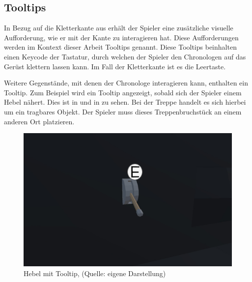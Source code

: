 \subsection{Tooltips}\label{sec:tooltip}

In Bezug auf die Kletterkante aus  erhält der Spieler eine zusätzliche visuelle Aufforderung, wie er mit der Kante zu interagieren hat. Diese Aufforderungen werden im Kontext dieser Arbeit Tooltips genannt. Diese Tooltips beinhalten einen Keycode der Tastatur, durch welchen der Spieler den Chronologen auf das Gerüst klettern lassen kann. Im Fall der Kletterkante ist es die Leertaste.

\newpage

Weitere Gegenstände, mit denen der Chronologe interagieren kann, enthalten ein Tooltip. Zum Beispiel wird ein Tooltip angezeigt, sobald sich der Spieler einem Hebel nähert. Dies ist in  und in  zu sehen. Bei der Treppe handelt es sich hierbei um ein tragbares Objekt. Der Spieler muss dieses Treppenbruchstück an einem anderen Ort platzieren.

\begin{figure}[ht]
\centering
\includegraphics[width=0.8\linewidth]{content/pictures/lever_tooltip.jpg}
\caption{Hebel mit Tooltip, (Quelle: eigene Darstellung)}
\label{fig:lever_tooltip}
\end{figure}

